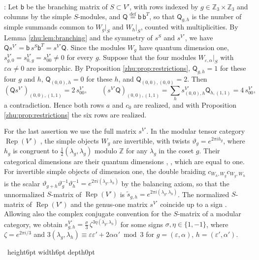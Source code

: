 \documentclass[leqno]{article}
\newcommand{\Z}{\ensuremath{\mathbb{Z}}}
\newcommand{\qed}{\hfill \vrule height6pt  width6pt depth0pt}
\newcommand{\ov}{\overset}
\newcommand{\epsi}{\varepsilon}
\DeclareMathOperator{\Rep}{Rep}
\newenvironment{proof}[1][]{\noindent {\it Proof #1} : }{\hbox{~}\qed
\smallskip
}
\numberwithin{equation}{section}
\begin{document}
\begin{proof}
Let $\mathsf b$ be the branching matrix of $S \subset V'$, with rows indexed by $g \in \Z_3 \times \Z_3$ and columns by the simple $S$-modules, and $\mathsf Q \ov{\mathrm{def}}{=} \mathsf b\, \mathsf b^T$, so that $\mathsf Q_{g,h}$ is the number of simple summands common to $W_g|_S$ and $W_h|_S$, counted with multiplicities. By Lemma \ref{zhu:lem:branching} and the symmetry of $s^S$ and $s^{V'}$, we have $\mathsf Q s^{V'} = \mathsf b\, s^S \mathsf b^T = s^{V'} \mathsf Q$. Since the modules $W_g$ have quantum dimension one, $s^{V'}_{g,0} = s^{V'}_{0,g} = s^{V'}_{00} \neq 0$ for every $g$. Suppose that the four modules $W_{\epsi,\alpha}|_S$ with $\epsi\alpha \neq 0$ are isomorphic. By Proposition \ref{zhu:prop:restrictions}, $\mathsf Q_{g,h} = 1$ for these four $g$ and $h$, $\mathsf Q_{(0,0),h} = 0$ for these $h$, and $\mathsf Q_{(0,0),(0,0)} = 2$. Then
\[
(\mathsf Q s^{V'})_{(0,0),(1,1)} = 2\, s^{V'}_{00}, \qquad (s^{V'}\mathsf Q)_{(0,0),(1,1)} = \sum_h s^{V'}_{(0,0),h}\mathsf Q_{h,(1,1)} = 4\, s^{V'}_{00},
\]
a contradiction. Hence both rows $a$ and $c_0$ are realized, and with Proposition \ref{zhu:prop:restrictions} the six rows are realized.

For the last assertion we use the full matrix $s^{V'}$. In the modular tensor category $\Rep(V')$ \cite{Hua08}, the simple objects $W_g$ are invertible, with twists $\vartheta_g = e^{2\pi i h_g}$, where $h_g$ is congruent to $\frac12(\lambda_g,\lambda_g)$ modulo $\Z$ for any $\lambda_g$ in the coset $g$. Their categorical dimensions are their quantum dimensions \cite[Theorem 3.10 p.~2142]{DLN15}, \cite[p.~5]{CKM22}, which are equal to one. For invertible simple objects of dimension one, the double braiding $c_{W_h,W_g}c_{W_g,W_h}$ is the scalar $\vartheta_{g+h}\vartheta_g^{-1}\vartheta_h^{-1} = e^{2\pi i(\lambda_g,\lambda_h)}$ by the balancing axiom, so that the unnormalized $S$-matrix of $\Rep(V')$ is $\tilde s_{g,h} = e^{2\pi i(\lambda_g,\lambda_h)}$. The normalized $S$-matrix of $\Rep(V')$ and the genus-one matrix $s^{V'}$ coincide up to a sign \cite[Theorem 3.10 p.~2142]{DLN15}. Allowing also the complex conjugate convention for the $S$-matrix of a modular category, we obtain $s^{V'}_{g,h} = \frac{\sigma}{3}\, \zeta^{3\eta(\lambda_g,\lambda_h)}$ for some signs $\sigma, \eta \in \{1,-1\}$, where $\zeta = e^{2\pi i/3}$ and $3(\lambda_g,\lambda_h) \equiv \epsi\epsi' + 2\alpha\alpha' \bmod 3$ for $g = (\epsi,\alpha)$, $h = (\epsi',\alpha')$.


\end{proof}
\end{document}

